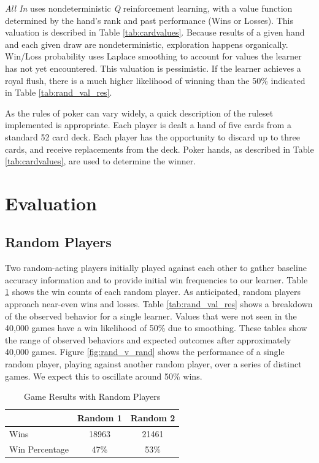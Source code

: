 \documentclass[12pt,pdftex]{article}
\begin{document}
\emph{All In} uses nondeterministic \emph{Q} reinforcement learning, with a value function determined by the hand's rank and past performance (Wins or Losses). This valuation is described in Table \ref{tab:cardvalues}. 
Because results of a given hand and each given draw are nondeterministic, exploration happens organically. 
Win/Loss probability uses Laplace smoothing to account for values the learner has not yet encountered. This valuation is pessimistic. 
If the learner achieves a royal flush, there is a much higher likelihood of winning than the 50\% indicated in Table \ref{tab:rand_val_res}. 

As the rules of poker can vary widely, a quick description of the ruleset implemented is appropriate.
Each player is dealt a hand of five cards from a standard 52 card deck. 
Each player has the opportunity to discard up to three cards, and receive replacements from the deck.
Poker hands, as described in Table \ref{tab:cardvalues}, are used to determine the winner.

\section{Evaluation} \label{sec:eval}

\subsection{Random Players}
Two random-acting players initially played against each other to gather baseline accuracy information and to provide initial win frequencies to our learner. 
Table \ref{tab:rand_res} shows the win counts of each random player. 
As anticipated, random players approach near-even wins and losses.
Table \ref{tab:rand_val_res} shows a breakdown of the observed behavior for a single learner. 
Values that were not seen in the 40,000 games have a win likelihood of 50\% due to smoothing.
These tables show the range of observed behaviors and expected outcomes after approximately 40,000 games.
Figure \ref{fig:rand_v_rand} shows the performance of a single random player, playing against another random player, over a series of distinct games.  We expect this to oscillate around 50\% wins. 

\begin{table}[h]
\centering
\begin{tabular}{| l | c | c |}
	\hline
& \textbf{Random 1} & \textbf{Random 2}\\
\hline
Wins & 18963 & 21461\\ %
	\hline
Win Percentage & 47\% &53\% \\
\hline
\end{tabular}
\caption{Game Results with Random Players}
\label{tab:rand_res}
\end{table}
\end{document}
